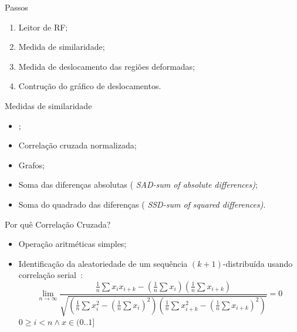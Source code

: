 \documentclass[]{beamer}
\begin{document}
\begin{frame}{Passos}

  \begin{enumerate}
  \item Leitor de RF;
  \item Medida de similaridade;
  \item Medida de deslocamento das regiões deformadas;
  \item Contrução do gráfico de deslocamentos.
  \end{enumerate}
  
\end{frame}

\begin{frame}{Medidas de similaridade}
\begin{itemize}
  \item {};
  \item {Correlação cruzada normalizada};
  \item {\color<2>{gray}Grafos};
   \item {Soma das diferenças absolutas (\scriptsize\em
       SAD-sum of absolute differences)};
   \item {Soma do quadrado das diferenças (\scriptsize\em
       SSD-sum of squared differences)}.


\end{itemize}
\end{frame}

\begin{frame}{Por quê Correlação Cruzada?}
  \begin{itemize}\footnotesize
    \item Operação aritméticas simples;
    \item Identificação da aleatoriedade de um
      sequência $(k+1)$-distribuída usando correlação serial~\cite{taocp2}:
      \begin{equation}
        \lim_{n\to\infty}\frac{\frac{1}{n}\sum x_ix_{i+k}-
          (\frac{1}{n}\sum x_i)(\frac{1}{n}\sum x_{i+k})}
        {\sqrt{(\frac{1}{n}\sum x_i^2-(\frac{1}{n}\sum x_i)^2)
          (\frac{1}{n}\sum x_{i+k}^2-(\frac{1}{n}\sum x_{i+k})^2)}}=0
      \end{equation}
      \hfil $0\geq i<n \wedge x \in (0..1]$
      
  \end{itemize}
\end{frame}
\end{document}
